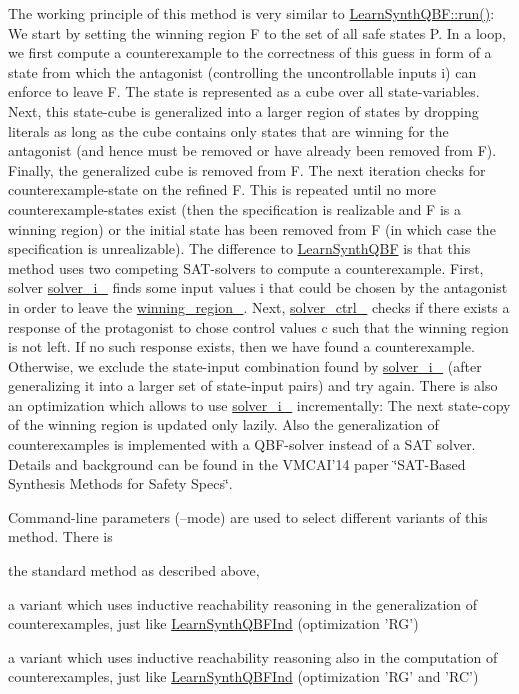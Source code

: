 The working principle of this method is very similar to \hyperlink{classLearnSynthQBF_aed85bb2fe317a5fdc7eef71fe598c606}{Learn\-Synth\-Q\-B\-F\-::run()}\-: We start by setting the winning region F to the set of all safe states P. In a loop, we first compute a counterexample to the correctness of this guess in form of a state from which the antagonist (controlling the uncontrollable inputs i) can enforce to leave F. The state is represented as a cube over all state-\/variables. Next, this state-\/cube is generalized into a larger region of states by dropping literals as long as the cube contains only states that are winning for the antagonist (and hence must be removed or have already been removed from F). Finally, the generalized cube is removed from F. The next iteration checks for counterexample-\/state on the refined F. This is repeated until no more counterexample-\/states exist (then the specification is realizable and F is a winning region) or the initial state has been removed from F (in which case the specification is unrealizable). The difference to \hyperlink{classLearnSynthQBF}{Learn\-Synth\-Q\-B\-F} is that this method uses two competing S\-A\-T-\/solvers to compute a counterexample. First, solver \hyperlink{classLearnSynthSAT_a97e5c03d47cb7f237104472972b12c1c}{solver\-\_\-i\-\_\-} finds some input values i that could be chosen by the antagonist in order to leave the \hyperlink{classLearnSynthSAT_aced2bce789c7a93ed4b5391dd0690616}{winning\-\_\-region\-\_\-}. Next, \hyperlink{classLearnSynthSAT_abb28d64291205442f1df055049ef0195}{solver\-\_\-ctrl\-\_\-} checks if there exists a response of the protagonist to chose control values c such that the winning region is not left. If no such response exists, then we have found a counterexample. Otherwise, we exclude the state-\/input combination found by \hyperlink{classLearnSynthSAT_a97e5c03d47cb7f237104472972b12c1c}{solver\-\_\-i\-\_\-} (after generalizing it into a larger set of state-\/input pairs) and try again. There is also an optimization which allows to use \hyperlink{classLearnSynthSAT_a97e5c03d47cb7f237104472972b12c1c}{solver\-\_\-i\-\_\-} incrementally\-: The next state-\/copy of the winning region is updated only lazily. Also the generalization of counterexamples is implemented with a Q\-B\-F-\/solver instead of a S\-A\-T solver. Details and background can be found in the V\-M\-C\-A\-I'14 paper \char`\"{}\-S\-A\-T-\/\-Based
\-Synthesis Methods for Safety Specs\char`\"{}.

Command-\/line parameters (--mode) are used to select different variants of this method. There is 
\begin{DoxyItemize}
\item the standard method as described above, 
\item a variant which uses inductive reachability reasoning in the generalization of counterexamples, just like \hyperlink{classLearnSynthQBFInd}{Learn\-Synth\-Q\-B\-F\-Ind} (optimization 'R\-G') 
\item a variant which uses inductive reachability reasoning also in the computation of counterexamples, just like \hyperlink{classLearnSynthQBFInd}{Learn\-Synth\-Q\-B\-F\-Ind} (optimization 'R\-G' and 'R\-C') 
\end{DoxyItemize}

